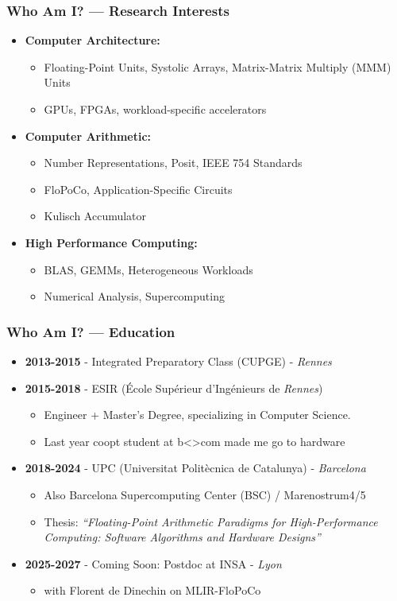 \begin{frame}
	\frametitle{Who Am I? — Research Interests}
	\begin{itemize}
		\item<1-> \textbf{Computer Architecture:}
		\begin{itemize}
			\item Floating-Point Units, Systolic Arrays, Matrix-Matrix Multiply (MMM) Units
			\item GPUs, FPGAs, workload-specific accelerators
		\end{itemize}
		\item<2-> \textbf{Computer Arithmetic:}
		\begin{itemize}
			\item Number Representations, Posit, IEEE 754 Standards
			\item FloPoCo, Application-Specific Circuits
			\item Kulisch Accumulator
		\end{itemize}
		\item<3-> \textbf{High Performance Computing:}
		\begin{itemize}
			\item BLAS, GEMMs, Heterogeneous Workloads
			\item Numerical Analysis, Supercomputing
		\end{itemize}
	\end{itemize}
\end{frame}

\begin{frame}
	\frametitle{Who Am I? — Education}
	\begin{itemize}
		\item<1-> \textbf{2013-2015} - Integrated Preparatory Class (CUPGE) - \textit{Rennes}
		\item<2-> \textbf{2015-2018} - ESIR (\'Ecole Supérieur d'Ing\'enieurs de \textit{Rennes})
		\begin{itemize}
			\item Engineer + Master's Degree, specializing in Computer Science.
			\item Last year coopt student at b<>com made me go to hardware
		\end{itemize}
		\item<3-> \textbf{2018-2024} - UPC (Universitat Politècnica de Catalunya) - \textit{Barcelona}
		\begin{itemize}
			\item Also Barcelona Supercomputing Center (BSC) / Marenostrum4/5
			\item Thesis: \textit{``Floating-Point Arithmetic Paradigms for High-Performance Computing: Software Algorithms and Hardware Designs''}
		\end{itemize}
		\item<4-> \textbf{2025-2027} - Coming Soon: Postdoc at INSA - \textit{Lyon}
		\begin{itemize}
			\item with Florent de Dinechin on MLIR-FloPoCo
		\end{itemize}
	\end{itemize}
\end{frame}

